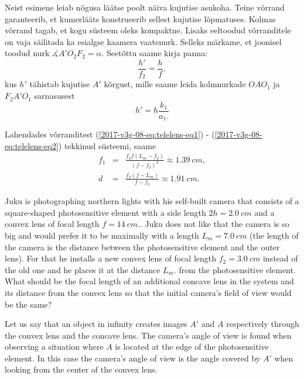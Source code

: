 {\noindent Neist esimene leiab nõgusa läätse poolt näiva kujutise asukoha.
Teine võrrand garanteerib, et kumerlääts konstrueerib sellest kujutise
lõpmatuses. Kolmas võrrand tagab, et kogu süsteem oleks kompaktne.
Lisaks eeltoodud võrranditele on vaja säilitada ka esialgse kaamera
vaatenurk. Selleks märkame, et joonisel toodud nurk $\measuredangle A'O_{2}F_{2}=\alpha.$
Seetõttu saame kirja panna:
\begin{equation}
\frac{h'}{f_{2}}=\frac{h}{f},
\end{equation}
\noindent kus $h'$ tähistab kujutise $A'$ kõrgust, mille saame leida
kolmnurkade $OAO_{1}$ ja $F_{2}A'O_{1}$ sarnasusest
\begin{equation}
h'=h\frac{k_{1}}{a_{1}.}\label{2017-v3g-08-eq:telelens-eq2}
\end{equation}

Lahendades võrranditest (\ref{2017-v3g-08-eq:telelens-eq1}) - (\ref{2017-v3g-08-eq:telelens-eq2})
tekkinud süsteemi, saame
\begin{eqnarray*}
f_{1} & = & \frac{f_{2}f(L_{m}-f_{2})}{\left(f-f_{2}\right)^{2}}\approx\SI{1.39}{cm},\\
d & = & \frac{f_{2}(f-L_{m})}{f-f_{2}}\approx\SI{1.91}{cm}.
\end{eqnarray*}
\fi


\ifEngStatement
Juku is photographing northern lights with his self-built camera that consists of a square-shaped photosensitive element with a side length $2h=\SI{2.0}{cm}$ and a convex lens of focal length $f=\SI{14}{cm}.$. Juku does not like that the camera is so big and would prefer it to be maximally with a length $L_{m}=\SI{7.0}{cm}$ (the length of the camera is the distance between the photosensitive element and the outer lens). For that he installs a new convex lens of focal length $f_{2}=\SI{3.0}{cm}$ instead of the old one and he places it at the distance $L_{m}.$ from the photosensitive element. What should be the focal length of an additional concave lens in the system and its distance from the convex lens so that the initial camera’s field of view would be the same?
\fi


\ifEngHint
Let us say that an object in infinity creates images $A'$ and $A$ respectively through the convex lens and the concave lens. The camera’s angle of view is found when observing a situation where $A$ is located at the edge of the photosensitive element. In this case the camera’s angle of view is the angle covered by $A'$ when looking from the center of the convex lens.
\fi


}
